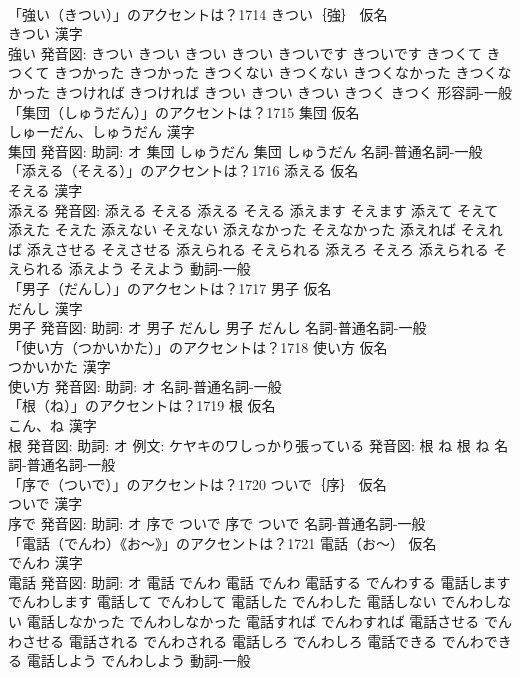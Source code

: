 \documentclass[8pt]{extreport}
\begin{document}
\begin{CJK}{UTF8}{min}
\\	「強い（きつい）」のアクセントは？1714	きつい｛強｝ 仮名　
\\	きつい 漢字　
\\	強い 発音図:	きつい きつい		きつい きつい きついです きついです きつくて きつくて きつかった きつかった きつくない きつくない きつくなかった きつくなかった きつければ きつければ きつい きつい きつい きつく きつく				形容詞-一般 
\\	「集団（しゅうだん）」のアクセントは？1715	集団 仮名　
\\	しゅーだん、しゅうだん 漢字　
\\	集団 発音図: 助詞: オ	集団 しゅうだん		集団 しゅうだん				名詞-普通名詞-一般 
\\	「添える（そえる）」のアクセントは？1716	添える 仮名　
\\	そえる 漢字　
\\	添える 発音図:	添える そえる		添える そえる 添えます そえます 添えて そえて 添えた そえた 添えない そえない 添えなかった そえなかった 添えれば そえれば 添えさせる そえさせる 添えられる そえられる 添えろ そえろ 添えられる そえられる 添えよう そえよう				動詞-一般 
\\	「男子（だんし）」のアクセントは？1717	男子 仮名　
\\	だんし 漢字　
\\	男子 発音図: 助詞: オ	男子 だんし		男子 だんし				名詞-普通名詞-一般 
\\	「使い方（つかいかた）」のアクセントは？1718	使い方 仮名　
\\	つかいかた 漢字　
\\	使い方 発音図: 助詞: オ							名詞-普通名詞-一般 
\\	「根（ね）」のアクセントは？1719	根 仮名　
\\	こん、ね 漢字　
\\	根 発音図: 助詞: オ 例文: ケヤキのワしっかり張っている 発音図:	根 ね		根 ね				名詞-普通名詞-一般 
\\	「序で（ついで）」のアクセントは？1720	ついで｛序｝ 仮名　
\\	ついで 漢字　
\\	序で 発音図: 助詞: オ	序で ついで		序で ついで				名詞-普通名詞-一般 
\\	「電話（でんわ）《お〜》」のアクセントは？1721	電話（お〜） 仮名　
\\	でんわ 漢字　
\\	電話 発音図: 助詞: オ	電話 でんわ		電話 でんわ 電話する でんわする 電話します でんわします 電話して でんわして 電話した でんわした 電話しない でんわしない 電話しなかった でんわしなかった 電話すれば でんわすれば 電話させる でんわさせる 電話される でんわされる 電話しろ でんわしろ 電話できる でんわできる 電話しよう でんわしよう				動詞-一般 

\end{CJK}
\end{document}
